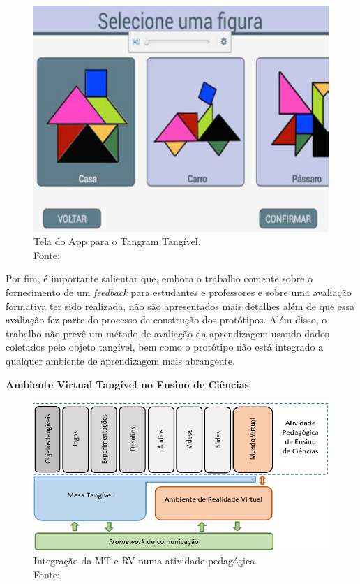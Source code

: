 \begin{figure}[htb]
	\centering
	\includegraphics[width=0.6\linewidth]{chapters/works/lima2016-4.png}
	\caption{Tela do App para o Tangram Tangível. \\Fonte:~\cite{lima:2016}}
	\label{fig:lima2016_app}
\end{figure}

Por fim, é importante salientar que, embora o trabalho comente sobre o fornecimento de um \textit{feedback} para estudantes e professores e sobre uma avaliação formativa ter sido realizada, não são apresentados mais detalhes além de que essa avaliação fez parte do processo de construção dos protótipos. Além disso, o trabalho não prevê um método de avaliação da aprendizagem usando dados coletados pelo objeto tangível, bem como o protótipo não está integrado a qualquer ambiente de aprendizagem mais abrangente.

\textbf{Ambiente Virtual Tangível no Ensino de Ciências}

\begin{figure}[htb]
	\centering
	\includegraphics[width=0.8\linewidth]{chapters/works/gluz2018.png}
	\captionsetup{justification=centering}
	\caption{Integração da MT e RV numa atividade pedagógica. \\Fonte:~\cite{gluz:2018}}
	\label{fig:gluz2018-framework}
\end{figure}

